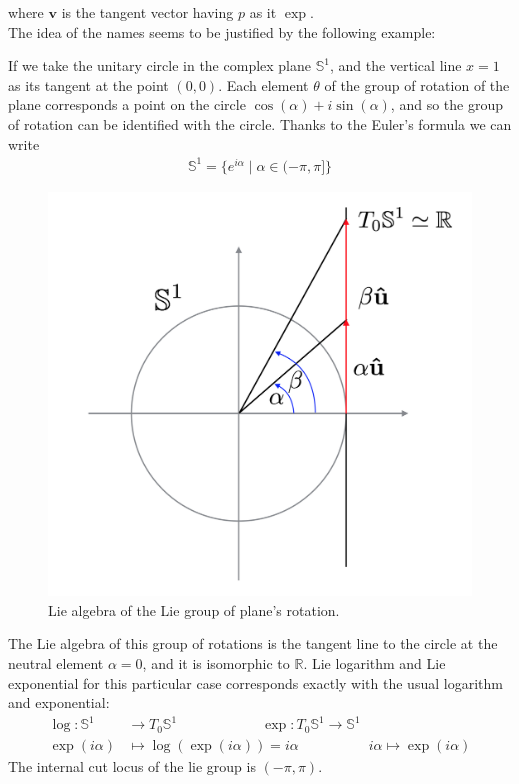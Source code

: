 where $\mathbf{v}  $ is the tangent vector having $p$ as it $\exp$.\\
The idea of the names seems to be justified by the following example:
\begin{example}
If we take the unitary circle in the complex plane $\mathbb{S}^{1}$, and the vertical line $x = 1$ as its tangent at the point $(0,0)$. Each element $\theta$ of the group of rotation of the plane corresponds a point on the circle $\cos(\alpha)+ i\sin(\alpha)$, and so the group of rotation can be identified with the circle. Thanks to the Euler's formula we can write
\begin{align*}
\mathbb{S}^{1} = \{e^{i\alpha}  \mid \alpha \in (-\pi,\pi] \}
\end{align*}
\begin{figure}[!ht]
	\centering
	\includegraphics[scale=0.35]{figures/circle_example.png}
	\caption{Lie algebra of the Lie group of plane's rotation.}
	\label{fig:evolution}
\end{figure}  
The Lie algebra of this group of rotations is the tangent line to the circle at the neutral element $\alpha = 0$, and it is isomorphic to $\mathbb{R}$. Lie logarithm and Lie exponential for this particular case corresponds exactly with the usual logarithm and exponential:
\begin{align*}
\log : \mathbb{S}^{1} & \longrightarrow T_{0} \mathbb{S}^{1} 
\qquad \qquad \quad \quad 
\exp : T_{0} \mathbb{S}^{1}  \longrightarrow \mathbb{S}^{1}
\\
\exp{(i\alpha)} &\longmapsto \log(\exp{(i\alpha)})  =  i\alpha 
\qquad \qquad \quad   
i\alpha \longmapsto \exp(i\alpha)  
\end{align*}
The internal cut locus of the lie group is $(-\pi, \pi)$.
\end{example}

